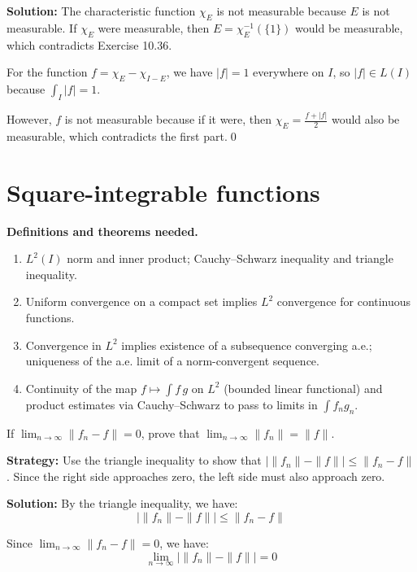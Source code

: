 \bigskip\noindent\textbf{Solution:}
The characteristic function $\chi_E$ is not measurable because $E$ is not measurable. If $\chi_E$ were measurable, then $E = \chi_E^{-1}(\{1\})$ would be measurable, which contradicts Exercise 10.36.

For the function $f = \chi_E - \chi_{I-E}$, we have $|f| = 1$ everywhere on $I$, so $|f| \in L(I)$ because $\int_I |f| = 1$.

However, $f$ is not measurable because if it were, then $\chi_E = \frac{f + |f|}{2}$ would also be measurable, which contradicts the first part.\qed
\section{Square-integrable functions}

\noindent\textbf{Definitions and theorems needed.}
\begin{enumerate}[label=(\alph*)]
\item $L^2(I)$ norm and inner product; Cauchy–Schwarz inequality and triangle inequality.
\item Uniform convergence on a compact set implies $L^2$ convergence for continuous functions.
\item Convergence in $L^2$ implies existence of a subsequence converging a.e.; uniqueness of the a.e. limit of a norm-convergent sequence.
\item Continuity of the map $f\mapsto \int f\,g$ on $L^2$ (bounded linear functional) and product estimates via Cauchy–Schwarz to pass to limits in $\int f_ng_n$.
\end{enumerate}



\begin{problembox}
\begin{problemstatement}
If $\lim_{n \to \infty} \| f_n - f \| = 0$, prove that $\lim_{n \to \infty} \| f_n \| = \| f \|$.
\end{problemstatement}
\end{problembox}

\noindent\textbf{Strategy:} Use the triangle inequality to show that $|\| f_n \| - \| f \|| \leq \| f_n - f \|$. Since the right side approaches zero, the left side must also approach zero.

\bigskip\noindent\textbf{Solution:}
By the triangle inequality, we have:
\[|\| f_n \| - \| f \|| \leq \| f_n - f \|\]

Since $\lim_{n \to \infty} \| f_n - f \| = 0$, we have:
\[\lim_{n \to \infty} |\| f_n \| - \| f \|| = 0\]


